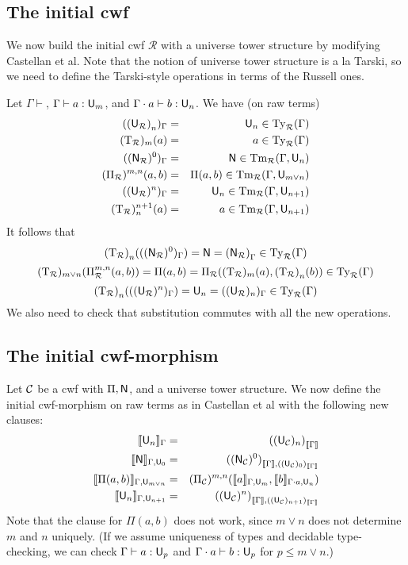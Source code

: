 \documentclass{lmcs}
\newcommand{\Ta}{\mathrm{T}}
\newcommand{\Ru}{\mathcal{R}}
\newcommand{\Un}{\U_n}
\newcommand{\TRu}{\Ta_\Ru}
\newcommand{\URu}{\U_\Ru}
\newcommand{\NRu}{\N_\Ru}
\newcommand{\PiRu}{\Pi_\Ru}
\newcommand{\TRun}{{(\Ta_\Ru)}_n}
\newcommand{\URun}{{(\U_\Ru)}_n}
\newcommand{\UC}{\U_\C}
\newcommand{\NC}{\N_\C}
\newcommand{\PiC}{\Pi_\C}
\begin{document}
\subsection{The initial cwf}

We now build the initial cwf $\Ru$ with a universe tower structure by modifying Castellan et al. Note that the notion of universe tower structure is a la Tarski, so we need to define the Tarski-style operations in terms of the Russell ones.

Let $\Gamma \vdash$, $\Gamma \vdash a : \mathsf{U}_m$, and $\Gamma \cdot a \vdash b : \Un$. We have (on raw terms)
\begin{eqnarray*}
({\URun})_\Gamma &=& \Un  \in \Ty_\Ru(\Gamma)\\
(\TRu)_m(a) &=& a \in \Ty_\Ru(\Gamma)\\
({(\NRu)^0})_\Gamma &=& \N \in \Tm_\Ru(\Gamma,\Un)\\
(\PiRu)^{m,n}(a,b) &=& \Pi(a,b) \in \Tm_\Ru(\Gamma,\U_{m \vee n})\\
(({\URu})^n)_\Gamma &=& \Un  \in \Tm_\Ru(\Gamma,\U_{n+1})\\
(\TRu)_n^{n+1}(a) &=& a \in \Tm_\Ru(\Gamma,\U_{n+1})
\end{eqnarray*}
It follows that 
$$
\TRun(((\NRu)^0)_\Gamma)  =  \N = {(\NRu)}_\Gamma \in \Ty_\Ru(\Gamma)
$$
$$
(\TRu)_{m \vee n}(\PiRu^{m,n}(a,b)) = \Pi(a,b) = \PiRu((\TRu)_m(a),\TRun(b))\in \Ty_\Ru(\Gamma)
$$
$$
\TRun(((\URu)^n)_\Gamma)  =  \Un = ({(\URu)_n})_\Gamma \in \Ty_\Ru(\Gamma)
$$
We also need to check that substitution commutes with all the new operations.

\subsection{The initial cwf-morphism}

Let ${\mathcal C}$ be a cwf with $\Pi, \mathsf{N}$, and a universe tower structure. We now define the initial cwf-morphism on raw terms as in Castellan et al with the following new clauses:
\begin{eqnarray*}
\inte{\Un}_\Gamma &=& {({({\UC})_n})}_{\inte{\Gamma}}\\
\inte{\N}_{\Gamma,\U_0} &=&  {({({\NC})^0})}_{\inte{\Gamma},((\UC)_0)_{\inte{\Gamma}}}\\
\inte{\Pi(a,b)}_{\Gamma,\U_{m \vee n}}&=& {{({\PiC})^{m,n}}}(\inte{a}_{\Gamma,\U_m},\inte{b}_{\Gamma \cdot a,\Un})\\
\inte{\U_n}_{\Gamma,\U_{n+1}} &=& {({({\UC})^n})}_{\inte{\Gamma},((\UC)_{n+1})_{\inte{\Gamma}}}
\end{eqnarray*}
Note that the clause for $\Pi(a,b)$ does not work, since $m \vee n$ does not determine $m$ and $n$ uniquely. (If we assume uniqueness of types and decidable type-checking, we can check $\Gamma \vdash a : \mathsf{U}_p$ and $\Gamma \cdot a \vdash b : \mathsf{U}_p$ for $p \leq m \vee n$.)
\end{document}
